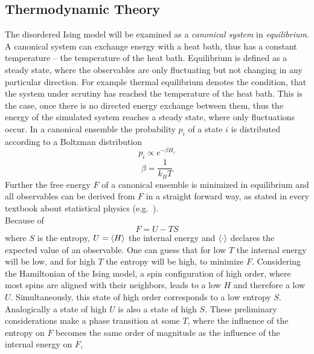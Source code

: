 \subsection{Thermodynamic Theory}
\label{ssec:theory}
    The disordered Ising model will be examined as a \emph{canonical system} in
    \emph{equilibrium}. A canonical system can exchange energy with a
    heat bath, thus has a constant temperature -- the temperature of the
    heat bath.
    Equilibrium is defined as a steady state, where
    the observables are only fluctuating but not changing in any
    particular direction. For example thermal equilibrium denotes the
    condition, that the system under scrutiny has reached the temperature
    of the heat bath. This is the case, once there is no directed energy
    exchange between them, thus the energy of the simulated system reaches
    a steady state, where only fluctuations occur.
    In a canonical ensemble the probability \(p_i\) of a state
    \(i\) is distributed according to a Boltzman distribution
    \begin{equation}
        p_i \propto e^{-\beta H_i}
    \end{equation}
    \begin{equation}
        \beta = \frac{1}{k_B T}
    \end{equation}
    Further the free energy \(F\) of a canonical ensemble is minimized
    in equilibrium and all observables can be derived from \(F\)
    in a straight forward way, as stated in every textbook about
    statistical physics (e.g.\ \cite{nolting2005}).\\
    Because of
    \begin{equation}
        F = U - TS
    \end{equation}
    where \(S\) is the entropy, \(U=\left< H \right>\) the internal energy and
    \(\left< \cdot \right>\) declares the expected value of an observable.
    One can guess that for low \(T\) the internal energy
    will be low, and for high \(T\) the entropy will be high, to minimize
    \(F\).
    Considering the Hamiltonian of the Ising model, a spin configuration
    of high order, where most spins are aligned with their neighbors,
    leads to a low \(H\) and therefore a low \(U\). Simultaneously, this
    state of high order corresponds to a low entropy \(S\).
    Analogically a state of high \(U\) is also a state of high \(S\).
    These preliminary considerations make a phase transition at some
    \(T\), where the influence of the entropy on \(F\) becomes the same
    order of magnitude as the influence of the internal energy on \(F\),
